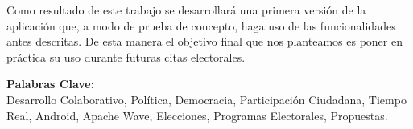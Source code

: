 Como resultado de este trabajo se desarrollará una primera versión de la aplicación que, a modo de prueba de concepto, haga uso de las funcionalidades antes descritas. De esta manera el objetivo final que nos planteamos es poner en práctica su uso durante futuras citas electorales.

\vfill
{\bf Palabras Clave:}\\
{Desarrollo Colaborativo, Política, Democracia, Participación Ciudadana, Tiempo Real, Android, Apache Wave, Elecciones, Programas Electorales, Propuestas.}

\newpage
\thispagestyle{empty}
\mbox{}

